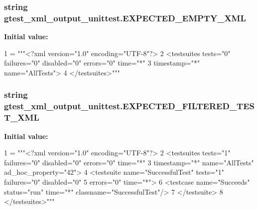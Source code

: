 \subsubsection[{E\+X\+P\+E\+C\+T\+E\+D\+\_\+\+E\+M\+P\+T\+Y\+\_\+\+X\+M\+L}]{\setlength{\rightskip}{0pt plus 5cm}string gtest\+\_\+xml\+\_\+output\+\_\+unittest.\+E\+X\+P\+E\+C\+T\+E\+D\+\_\+\+E\+M\+P\+T\+Y\+\_\+\+X\+M\+L}\label{namespacegtest__xml__output__unittest_abe1569d019b037f006986004349c7cf3}
{\bfseries Initial value\+:}
\begin{DoxyCode}
1 = \textcolor{stringliteral}{"""<?xml version="1.0" encoding="UTF-8"?>}
2 \textcolor{stringliteral}{<testsuites tests="0" failures="0" disabled="0" errors="0" time="*"}
3 \textcolor{stringliteral}{            timestamp="*" name="AllTests">}
4 \textcolor{stringliteral}{</testsuites>"""}
\end{DoxyCode}
\hypertarget{namespacegtest__xml__output__unittest_a1adb060422f833cb8b99403d13144399}{}
\subsubsection[{E\+X\+P\+E\+C\+T\+E\+D\+\_\+\+F\+I\+L\+T\+E\+R\+E\+D\+\_\+\+T\+E\+S\+T\+\_\+\+X\+M\+L}]{\setlength{\rightskip}{0pt plus 5cm}string gtest\+\_\+xml\+\_\+output\+\_\+unittest.\+E\+X\+P\+E\+C\+T\+E\+D\+\_\+\+F\+I\+L\+T\+E\+R\+E\+D\+\_\+\+T\+E\+S\+T\+\_\+\+X\+M\+L}\label{namespacegtest__xml__output__unittest_a1adb060422f833cb8b99403d13144399}
{\bfseries Initial value\+:}
\begin{DoxyCode}
1 = \textcolor{stringliteral}{"""<?xml version="1.0" encoding="UTF-8"?>}
2 \textcolor{stringliteral}{<testsuites tests="1" failures="0" disabled="0" errors="0" time="*"}
3 \textcolor{stringliteral}{            timestamp="*" name="AllTests" ad\_hoc\_property="42">}
4 \textcolor{stringliteral}{  <testsuite name="SuccessfulTest" tests="1" failures="0" disabled="0"}
5 \textcolor{stringliteral}{             errors="0" time="*">}
6 \textcolor{stringliteral}{    <testcase name="Succeeds" status="run" time="*" classname="SuccessfulTest"/>}
7 \textcolor{stringliteral}{  </testsuite>}
8 \textcolor{stringliteral}{</testsuites>"""}
\end{DoxyCode}
\hypertarget{namespacegtest__xml__output__unittest_ab6a01b4b81a702e476f53b1b3c4983c0}{}
